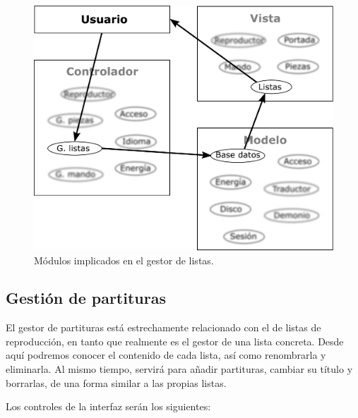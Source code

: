 \begin{figure}[H]
	\noindent \begin{centering}
		\includegraphics[width=\linewidth/2]{capitulo4/mvc_listas}
		\par\end{centering}
	\smallskip
	\caption{\label{fig:mvc_listas} Módulos implicados en el gestor de listas.}
\end{figure} 

\smallskip

\subsection{Gestión de partituras}
\label{subsec:piezas}

El gestor de partituras está estrechamente relacionado con el de listas de reproducción, en tanto que realmente es el gestor de una lista concreta. Desde aquí podremos conocer el contenido de cada lista, así como renombrarla y eliminarla. Al mismo tiempo, servirá para añadir partituras, cambiar su título y borrarlas, de una forma similar a las propias listas.

Los controles de la interfaz serán los siguientes:

